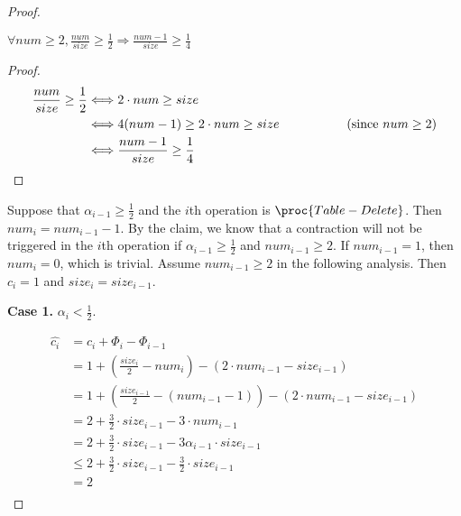 \begin{proof}
    \begin{claim}
        $\forall num \geq 2, \frac{num}{size} \geq \frac{1}{2}
        \Longrightarrow \frac{num - 1}{size} \geq \frac{1}{4}$
    \end{claim}
    
    \begin{proof}
        \begin{equation*}
        \begin{split}
            \frac{num}{size} \geq \frac{1}{2}
            & \Longleftrightarrow
            2 \cdot num \geq size \\
            & \Longleftrightarrow
            4(num - 1) \geq 2 \cdot num \geq size 
            \text{ \quad\quad\quad\quad\quad 
            (since $num \geq 2$)}\\
            & \Longleftrightarrow
            \frac{num - 1}{size} \geq \frac{1}{4} \\
        \end{split}
        \end{equation*}
    \end{proof}
    
    Suppose that $\alpha_{i-1} \geq \frac{1}{2}$
    and the $i$th operation is $\proc{Table-Delete}$.
    Then $num_i = num_{i-1} - 1$.
    By the claim, we know that a contraction will not be triggered
    in the $i$th operation
    if $\alpha_{i-1} \geq \frac{1}{2}$ and 
    $num_{i-1} \geq 2$.
    If $num_{i-1} = 1$, then $num_i = 0$, which is trivial.
    Assume $num_{i-1} \geq 2$ in the following analysis.
    Then $c_i = 1$ and $size_i = size_{i-1}$.
    
    \textbf{Case 1.}
    $\alpha_i < \frac{1}{2}$.
    
    \begin{equation*}
    \begin{split}
        \hat{c_i} & = c_i + \Phi_i - \Phi_{i-1} \\
        & = 1 + (\frac{size_i}{2} - num_i) - (2 \cdot num_{i-1} - size_{i-1}) \\
        & = 1 + (\frac{size_{i-1}}{2} - (num_{i-1} - 1)) - (2 \cdot num_{i-1} - size_{i-1}) \\
        & = 2 + \frac{3}{2} \cdot size_{i-1} - 3 \cdot num_{i-1} \\
        & = 2 + \frac{3}{2} \cdot size_{i-1} - 3 \alpha_{i-1} \cdot size_{i-1} \\
        & \leq 2 + \frac{3}{2} \cdot size_{i-1} - \frac{3}{2} \cdot size_{i-1} \\
        & = 2 \\
    \end{split}
    \end{equation*}
    

\end{proof}
